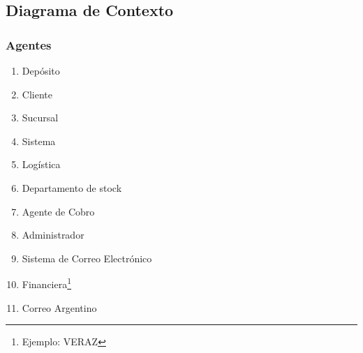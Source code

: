 \subsection{Diagrama de Contexto}

\subsubsection{Agentes}

\begin{enumerate}
  \item Depósito
  \item Cliente
  \item Sucursal
  \item Sistema
  \item Logística
  \item Departamento de stock 
  \item Agente de Cobro
  \item Administrador
  \item Sistema de Correo Electrónico
  \item Financiera\footnote{Ejemplo: VERAZ}
  \item Correo Argentino
\end{enumerate}
\clearpage


